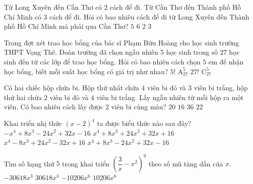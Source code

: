 \begin{ex}%
	Từ Long Xuyên đến Cần Thơ có $2$ cách để đi. Từ Cần Thơ đến Thành phố Hồ Chí Minh có $3$ cách để đi. Hỏi có bao nhiêu cách để đi từ Long Xuyên đến Thành phố Hồ Chí Minh mà phải qua Cần Thơ?
	\choice
	{$5$}
	{\True $6$}
	{$2$}
	{$3$}
\end{ex}
\begin{ex}%
	Trong đợt xét trao học bổng của bác sĩ Phạm Bửu Hoàng cho học sinh trường THPT Vọng Thê. Đoàn trường đã chọn ngẫu nhiên $5$ học sinh trong số $27$ học sinh đến từ các lớp để trao học bổng. Hỏi có bao nhiêu cách chọn $5$ em để nhận học bổng, biết mỗi suất học bổng có giá trị như nhau?
	\choice
	{$5!$}
	{$\mathrm{A}^5_{27}$}
	{$27!$}
	{\True $\mathrm{C}^5_{27}$}
\end{ex}
\begin{ex}%
	Có hai chiếc hộp chứa bi. Hộp thứ nhất chứa $4$ viên bi đỏ và $3$ viên bi trắng, hộp thứ hai chứa $2$ viên bi đỏ và $4$ viên bi trắng. Lấy ngẫu nhiên từ mỗi hộp ra một viên. Có bao nhiêu cách lấy được $2$ viên bi cùng màu?
	\choice
	{\True $20$}
	{$16$}
	{$36$}
	{$22$}
\end{ex}
\begin{ex}%
	Khai triển nhị thức $(x-2)^4$ ta được biểu thức nào sau đây?
	\choice
	{$-x^4+8x^3-24x^2+32x-16$}
	{$x^4+8x^3+24x^2+32x+16$}
	{\True $x^4-8x^3+24x^2-32x+16$}
	{$x^4+8x^3-24x^2+32x-16$}
\end{ex}
\begin{ex}%
	Tìm số hạng thứ $5$ trong khai triển $\left(\dfrac{3}{x}-x^2\right)^9$ theo số mũ tăng dần của $x$.
	\choice
	{$-30618x^3$}
	{\True $30618x^3$}
	{$-10206x^6$}
	{$10206x^6$}
\end{ex}
